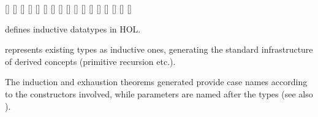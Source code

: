 \begin{isabellebody}
\begin{isamarkuptext}
  \begin{railoutput}
[]
\rail@plus
{}[]
[]
\rail@endplus
\rail@end
{}
[]
\rail@bar
{}
[]
\rail@plus
{}[]
\rail@endplus
{}[]
\rail@endbar
\rail@plus
{}[]
\rail@endplus
\rail@end
{}
\rail@bar
{}
[]
\rail@endbar
{}[]
\rail@bar
{}
[]
\rail@endbar
{}[]
\rail@plus
{}[]
[]
\rail@endplus
\rail@end
{}
[]
\rail@plus
{}
[]
\rail@endplus
\rail@bar
{}
[]
\rail@endbar
\rail@end
\end{railoutput}


  \begin{description}

  \item \hyperlink{command.HOL.datatype}{\mbox{}} defines inductive datatypes in
  HOL.

  \item \hyperlink{command.HOL.rep-datatype}{\mbox{}} represents existing types as
  inductive ones, generating the standard infrastructure of derived
  concepts (primitive recursion etc.).

  \end{description}

  The induction and exhaustion theorems generated provide case names
  according to the constructors involved, while parameters are named
  after the types (see also ).


\end{isamarkuptext}
\end{isabellebody}
